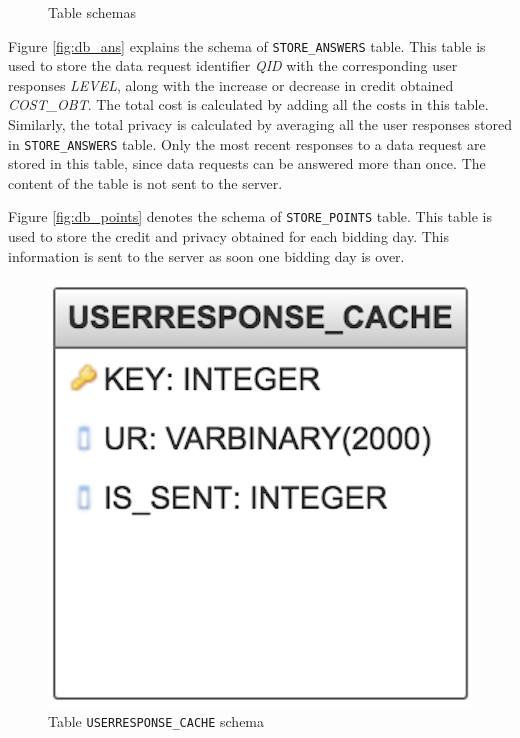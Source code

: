 \begin{figure}[htp]
 \hspace{1em}
\caption{Table schemas}
\label{fig:ts11}
\end{figure}

Figure \ref{fig:db_ans} explains the schema of \texttt{STORE\_ANSWERS} table. This table is used to store the data request identifier \textit{QID} with the corresponding
user responses \textit{LEVEL}, along with the increase or decrease in credit obtained \textit{COST\_OBT}. The total cost is calculated by adding all the costs in this table. Similarly, the total privacy is calculated by averaging all the user responses stored in \texttt{STORE\_ANSWERS} table. Only the most recent responses to a data request are stored in this table, since data requests can be answered more than once. The content of the table is not sent to the server.

Figure \ref{fig:db_points} denotes the schema of \texttt{STORE\_POINTS} table. This table is used to store the credit and privacy obtained for each bidding day.
This information is sent to the server as soon one bidding day is over.

\begin{figure}[ht!]
\centering
\includegraphics[width=0.4\linewidth]{./images/db_ur1}
\caption{Table \texttt{USERRESPONSE\_CACHE} schema}
\label{fig:db_ur}
\end{figure}

